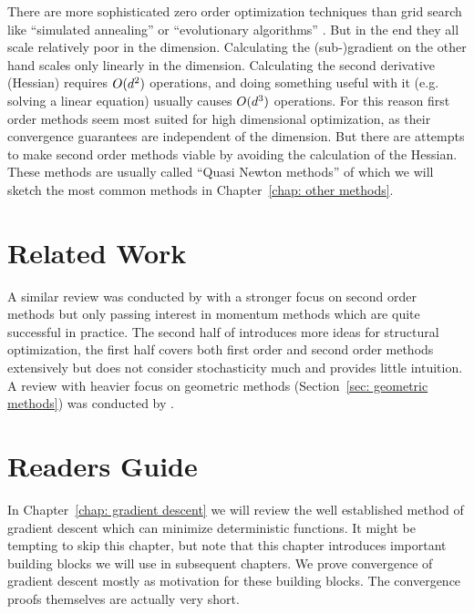 There are more sophisticated zero order optimization techniques than grid
search like ``simulated annealing'' \parencite[e.g.][]{bouttierConvergenceRateSimulated2019}
or ``evolutionary algorithms'' \parencite[e.g.][]{heConditionsConvergenceEvolutionary2001}.
But in the end they all scale relatively poor in the dimension. Calculating the
\mbox{(sub-)gradient} on the other hand scales only linearly in the dimension.
Calculating the second derivative (Hessian) requires \(O(d^2)\)
operations, and doing something useful with it (e.g. solving a linear
equation) usually causes \(O(d^3)\) operations. For this reason first
order methods seem most suited for high dimensional optimization, as their
convergence guarantees are independent of the dimension. But there are attempts
to make second order methods viable by avoiding the calculation of the Hessian.
These methods are usually called ``Quasi Newton methods'' of which we will 
sketch the most common methods in Chapter~\ref{chap: other methods}.

\section{Related Work}

A similar review was conducted by
\textcite{bottouOptimizationMethodsLargeScale2018} with a stronger focus on
second order methods but only passing interest in
momentum methods which are quite successful in practice.
The second half of \textcite{nesterovLecturesConvexOptimization2018} introduces
more ideas for structural optimization, the first half covers both first order
and second order methods extensively but does not consider stochasticity much
and provides little intuition.
A review with heavier focus on geometric methods (Section~\ref{sec: geometric methods}) 
was conducted by \textcite{bubeckConvexOptimizationAlgorithms2015}.

\section{Readers Guide}

In Chapter~\ref{chap: gradient descent} we will review the well
established method of gradient descent which can minimize deterministic
functions. It might be tempting to skip this chapter, but note that this chapter 
introduces important building blocks we will use in subsequent chapters. We
prove convergence of gradient descent mostly as motivation for these building blocks.
The convergence proofs themselves are actually very short.

